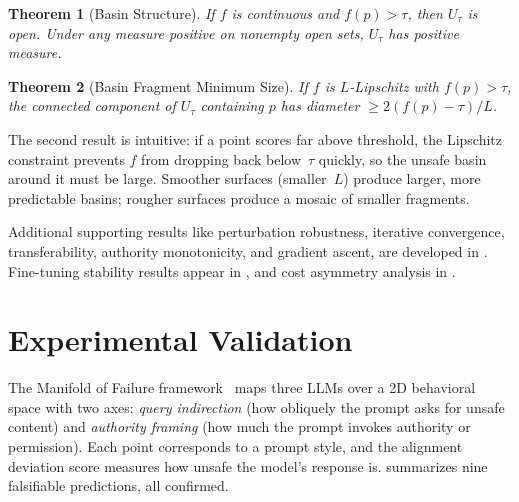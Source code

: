 \documentclass[11pt]{article}
\newtheorem{theorem}{Theorem}[section]
\begin{document}
\begin{theorem}[Basin Structure]
\label{thm:basin}
If $f$ is continuous and $f(p)>\tau$, then $U_\tau$ is open. Under
any measure positive on nonempty open sets, $U_\tau$ has positive
measure.
\end{theorem}

\begin{theorem}[Basin Fragment Minimum Size]
\label{thm:fragment}
If $f$ is $L$-Lipschitz with $f(p) > \tau$, the connected component
of $U_\tau$ containing $p$ has diameter $\geq 2(f(p) - \tau)/L$.
\end{theorem}

The second result is intuitive: if a point scores far above threshold,
the Lipschitz constraint prevents $f$ from dropping back
below~$\tau$ quickly, so the unsafe basin around it must be large.
Smoother surfaces (smaller~$L$) produce larger, more predictable
basins; rougher surfaces produce a mosaic of smaller fragments.

Additional supporting results like perturbation robustness, iterative
convergence, transferability, authority monotonicity, and gradient
ascent, are developed in . Fine-tuning stability
results appear in , and cost asymmetry analysis
in .


\section{Experimental Validation}
\label{sec:experiments}

The Manifold of
Failure framework~\cite{munshi2026manifold} maps three LLMs over a 2D
behavioral space with two axes: \emph{query indirection} (how obliquely
the prompt asks for unsafe content) and \emph{authority framing} (how
much the prompt invokes authority or permission). Each point corresponds
to a prompt style, and the alignment deviation score measures how
unsafe the model's response is.  summarizes
nine falsifiable predictions, all confirmed.
\end{document}
